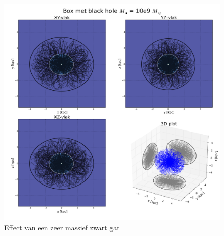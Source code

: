 \documentclass[11pt,a4paper,twoside,dutch]{article}
\begin{document}
\newpage
\vfill
\begin{figure}
\centering
\includegraphics[width=1\textwidth]{img/bh.png}
\caption{Effect van een zeer massief zwart gat}
\label{fig:bigbhplot}
\end{figure}
\vfill
\end{document}

